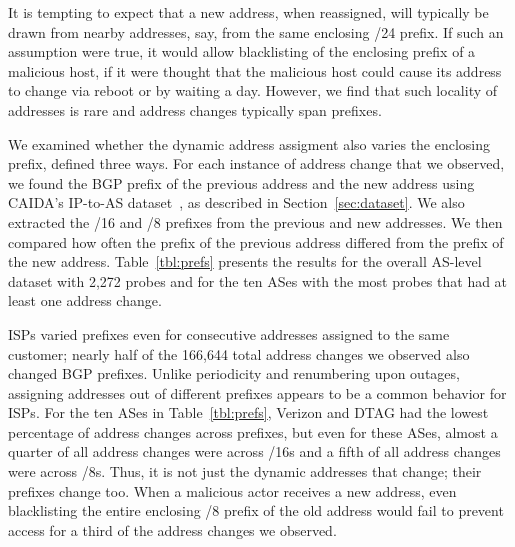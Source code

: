 It is tempting to expect that a new address, when
reassigned, will typically be drawn from nearby addresses,
say, from the same enclosing /24 prefix.  If such an
assumption were true, it would allow blacklisting of the
enclosing prefix of a malicious host, if it were thought
that the malicious host could cause its address to change
via reboot or by waiting a day.  However, we find that such
locality of addresses is rare and address changes typically
span prefixes.

We examined whether the dynamic address assigment also varies the
enclosing prefix, defined three ways. 
For each instance of address change that
we observed, we found the BGP prefix of the previous address and the
new address using CAIDA's IP-to-AS
dataset~\cite{caidapfx2as}, as described in
Section~\ref{sec:dataset}. We also extracted the /16 and /8 prefixes from the
previous and new addresses.  We then compared how often the prefix of
the previous address differed from the prefix of the new address.  
Table~\ref{tbl:prefs} presents the results for the overall AS-level dataset with 2,272
probes and for the ten ASes with the most probes that
had at least one address change.

ISPs varied prefixes even for consecutive addresses
assigned to the same customer; nearly half of the 166,644 total address
changes we observed also changed BGP prefixes. Unlike periodicity and renumbering upon
outages, assigning addresses out of different prefixes appears to be a
common behavior for ISPs. For the ten ASes in
Table~\ref{tbl:prefs}, Verizon and DTAG had the lowest percentage of
address changes across prefixes, but even for these ASes, almost a
quarter of all address changes were across /16s and a fifth of all
address changes were across /8s. Thus, it is not just
the dynamic addresses that change; their prefixes change too. When a
malicious actor receives a new address, even blacklisting the entire
enclosing /8 prefix of the old address would fail to prevent access
for a third of
the address changes we observed.

\clearpage